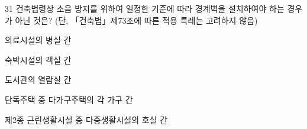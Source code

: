 \begin{question}{31}
건축법령상 소음 방지를 위하여 일정한 기준에 따라 경계벽을 설치하여야 하는 경우가 아닌 것은? (단, 「건축법」제73조에 따른 적용 특례는 고려하지 않음)
\begin{choices}
  \item 의료시설의 병실 간
  \item 숙박시설의 객실 간
  \item 도서관의 열람실 간
  \item 단독주택 중 다가구주택의 각 가구 간
  \item 제2종 근린생활시설 중 다중생활시설의 호실 간
\end{choices}
\end{question}

